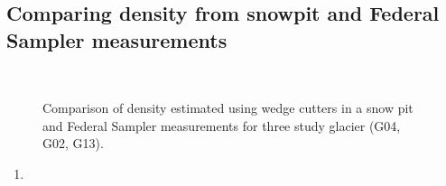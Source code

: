 \documentclass[12pt]{article}
\begin{document}
\subsection*{Comparing density from snowpit and Federal Sampler measurements}


\begin{figure}
	\centering
	\\
	\caption{Comparison of density estimated using wedge cutters in a snow pit and Federal Sampler measurements for three study glacier (G04, G02, G13).}
	\label{fig:density_pitVStube}
\end{figure}




\begin{enumerate}
\item 
\end{enumerate}
\end{document}

